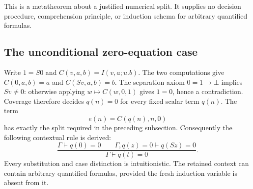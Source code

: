 This is a metatheorem about a justified numerical split.  It supplies no
decision procedure, comprehension principle, or induction schema for
arbitrary quantified formulas.

\subsection{The unconditional zero-equation case}
Write $1=S0$ and $C(v,a,b)=I(v,a;u.b)$.  The two computations give
$C(0,a,b)=a$ and $C(Sv,a,b)=b$.
The separation axiom $0=1\to\bot$ implies $Sv\ne0$: otherwise applying
$w\mapsto C(w,0,1)$ gives $1=0$, hence a contradiction.
Coverage therefore decides $q(n)=0$ for every fixed scalar term $q(n)$.
The term
\[
                             e(n)=C(q(n),n,0)
\]
has exactly the split required in the preceding subsection.
Consequently the following contextual rule is derived:
\[
 \frac{\Gamma\vdash q(0)=0\qquad
       \Gamma,q(z)=0\vdash q(Sz)=0}
      {\Gamma\vdash q(t)=0}.                            \tag{ZI}
\]
Every substitution and case distinction is intuitionistic.  The retained
context can contain arbitrary quantified formulas, provided the fresh
induction variable is absent from it.
